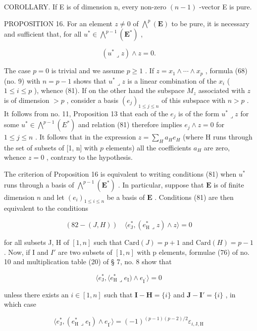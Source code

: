 COROLLARY. If E is of dimension n, every non-zero \((n - 1)\) -vector E is pure.

PROPOSITION 16. For an element \(z \neq 0\) of \(\bigwedge^{p}(\mathbf{E})\) to be pure, it is necessary and sufficient that, for all \(u^{*} \in \bigwedge^{p-1}(\mathbf{E}^{*})\) ,

\[
(u ^ {*} \lrcorner z) \wedge z = 0.\tag{81}
\]

The case \(p = 0\) is trivial and we assume \(p \geqslant 1\) . If \(z = x_1 \wedge \cdots \wedge x_p\) , formula (68) (no. 9) with \(n = p - 1\) shows that \(u^* \lrcorner z\) is a linear combination of the \(x_i\) ( \(1 \leqslant i \leqslant p\) ), whence (81). If on the other hand the subspace \(M_z\) associated with \(z\) is of dimension \(>p\) , consider a basis \((e_j)_{1 \leqslant j \leqslant n}\) of this subspace with \(n >p\) . It follows from no. 11, Proposition 13 that each of the \(e_j\) is of the form \(u^* \lrcorner z\) for some \(u^* \in \bigwedge^{p-1}(E^*)\) and relation (81) therefore implies \(e_j \wedge z = 0\) for \(1 \leqslant j \leqslant n\) . It follows that in the expression \(z = \sum_{H} a_H e_H\) (where H runs through the set of subsets of {[}1, n{]} with \(p\) elements) all the coefficients \(a_H\) are zero, whence \(z = 0\) , contrary to the hypothesis.

The criterion of Proposition 16 is equivalent to writing conditions (81) when \(u^*\) runs through a basis of \(\bigwedge^{p-1}(\mathbf{E}^*)\) . In particular, suppose that \(\mathbf{E}\) is of finite dimension \(n\) and let \((e_i)_{1\leq i\leq n}\) be a basis of \(\mathbf{E}\) . Conditions (81) are then equivalent to the conditions

\[
(82-(J, H)) \quad \langle e _ {\mathrm{J}} ^ {*}, (e _ {\mathrm{H}} ^ {*} \lrcorner z) \wedge z \rangle = 0
\]

for all subsets J, H of \([1, n]\) such that \(\text{Card}(J) = p + 1\) and \(\text{Card}(H) = p - 1\) . Now, if I and \(I'\) are two subsets of \([1, n]\) with p elements, formulae (76) of no. 10 and multiplication table (20) of § 7, no. 8 show that

\[
\langle e _ {\mathrm{J}} ^ {*}, \langle e _ {\mathrm{H}} ^ {*} \lrcorner e _ {\mathrm{I}}) \wedge e _ {\mathrm{I} ^ {\prime}} \rangle = 0
\]

unless there exists an \(i \in [1, n]\) such that \(\mathbf{I} - \mathbf{H} = \{i\}\) and \(\mathbf{J} - \mathbf{I}' = \{i\}\) , in which case

\[
\langle e _ {\mathrm{J}} ^ {*}, (e _ {\mathrm{H}} ^ {*} \lrcorner e _ {\mathrm{I}}) \wedge e _ {\mathrm{I} ^ {\prime}} \rangle = (- 1) ^ {(p - 1) (p - 2) / 2} \varepsilon_ {i, \mathrm{J,H}}\tag{83}
\]

